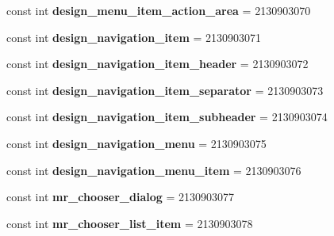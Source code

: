 \begin{DoxyCompactItemize}
const int {\bfseries design\+\_\+menu\+\_\+item\+\_\+action\+\_\+area} = 2130903070
\item 
\mbox{\label{class_pinned_app_1_1_droid_1_1_resource_1_1_layout_a387963ca1af55f8333de5713d83f8f6d}} 
const int {\bfseries design\+\_\+navigation\+\_\+item} = 2130903071
\item 
\mbox{\label{class_pinned_app_1_1_droid_1_1_resource_1_1_layout_a856ddac52ae9a02c21b402a53fb4ca2c}} 
const int {\bfseries design\+\_\+navigation\+\_\+item\+\_\+header} = 2130903072
\item 
\mbox{\label{class_pinned_app_1_1_droid_1_1_resource_1_1_layout_a54da60ef1c7e073875d1fd0f0ce81153}} 
const int {\bfseries design\+\_\+navigation\+\_\+item\+\_\+separator} = 2130903073
\item 
\mbox{\label{class_pinned_app_1_1_droid_1_1_resource_1_1_layout_a3ea929a7b2e7d5b2c3cbb6475bb06f19}} 
const int {\bfseries design\+\_\+navigation\+\_\+item\+\_\+subheader} = 2130903074
\item 
\mbox{\label{class_pinned_app_1_1_droid_1_1_resource_1_1_layout_a5b2e2726eb04dbeded11776e48b58adc}} 
const int {\bfseries design\+\_\+navigation\+\_\+menu} = 2130903075
\item 
\mbox{\label{class_pinned_app_1_1_droid_1_1_resource_1_1_layout_a6dd7e368b6faa52278bbfd4d712cb102}} 
const int {\bfseries design\+\_\+navigation\+\_\+menu\+\_\+item} = 2130903076
\item 
\mbox{\label{class_pinned_app_1_1_droid_1_1_resource_1_1_layout_a91444cb1eed21c08f58e1d1963106413}} 
const int {\bfseries mr\+\_\+chooser\+\_\+dialog} = 2130903077
\item 
\mbox{\label{class_pinned_app_1_1_droid_1_1_resource_1_1_layout_a273a1d54623299c5ef8faebd11754b02}} 
const int {\bfseries mr\+\_\+chooser\+\_\+list\+\_\+item} = 2130903078

\end{DoxyCompactItemize}
